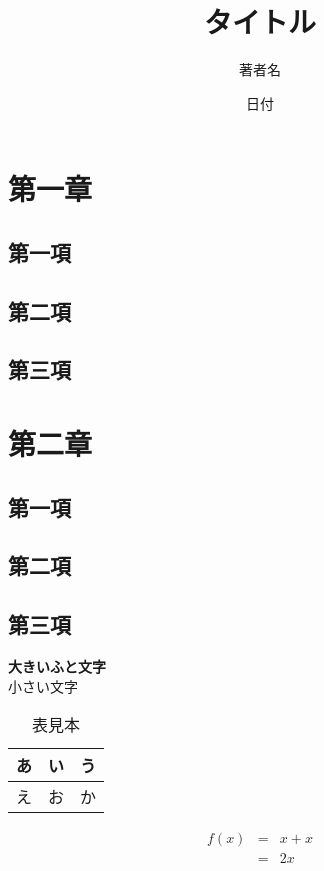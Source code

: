 \documentclass[a4papaer]{jarticle}
\title{タイトル}
\author{著者名}
\date{日付}
\begin{document}
  \maketitle
  \newpage
  \section{第一章}
    \subsection{第一項}
    \subsection{第二項}
    \subsection{第三項}
  \section{第二章}
    \subsection{第一項}
    \subsection{第二項}
    \subsection{第三項}

    {\Huge\bf 大きいふと文字}\\
    {\tiny 小さい文字}

    \begin{table}[h]
      \centering
      \label{hyou}
      \caption{表見本}
      \begin{tabular}{|c|c|c|} \hline
        あ & い & う \\ \hline
        え & お & か \\ \hline
      \end{tabular}
    \end{table}

    \begin{eqnarray*}
      f(x)&=&x+x\\
          &=&2x
    \end{eqnarray*}
\end{document}
